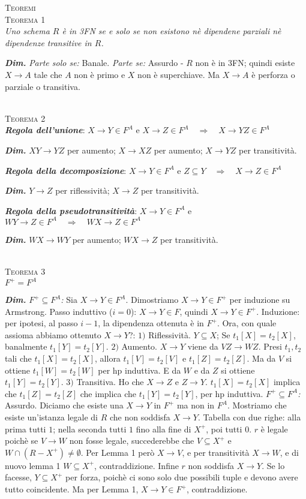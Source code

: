 \documentclass[a4paper,10pt]{article} %
\newcommand{\dimo}[1]{%
    \par \hfill\begin{minipage}{0.99\linewidth}{ \tiny {\textbf{\em{Dim.}}} {#1} }\end{minipage}}
\newcommand{\mtheorem}[1]{%
    {\hspace*{-10pt} \textsc {#1}}}
\newcommand{\msection}[1]{%
    {\normalsize \textsc {#1}\\[1ex]}}
\begin{document}
\msection{Teoremi}
    \mtheorem {Teorema 1}\\
        \emph{Uno schema $R$ è in 3FN se e solo se non esistono nè dipendene parziali nè dipendenze transitive in $R$.}
        \dimo{\emph{Parte solo se:} Banale.
              \emph{Parte se:} Assurdo - $R$ non è in 3FN; quindi esiste $X \rightarrow A$ tale che $A$ non è primo e $X$ non è superchiave. Ma $X \rightarrow A$ è perforza o parziale o transitiva.}
    \\[1ex]
    \mtheorem {Teorema 2}\\
        \emph{\textbf{Regola dell'unione}}: $X \rightarrow Y \in F^A$ e $X \rightarrow Z \in F^A \quad \Rightarrow \quad X \rightarrow YZ \in F^A$
        \dimo{$XY \rightarrow YZ$ per aumento; $X \rightarrow XZ$ per aumento; $X \rightarrow YZ$ per transitività.}
        \emph{\textbf{Regola della decomposizione}}: $X \rightarrow Y \in F^A$ e $Z \subseteq Y \quad \Rightarrow \quad X \rightarrow Z \in F^A$
        \dimo{$Y \rightarrow Z$ per riflessività; $X \rightarrow Z$ per transitività.}
        \emph{\textbf{Regola della pseudotransitività}}: $X \rightarrow Y \in F^A$ e $WY \rightarrow Z \in F^A \quad \Rightarrow \quad WX \rightarrow Z \in F^A$
        \dimo{$WX \rightarrow WY$ per aumento; $WX \rightarrow Z$ per transitività.}
    \\[1ex]
    \mtheorem {Teorema 3}\\
        \textbf{$F^+ = F^A$}
        \dimo{
            \emph{$F^+ \subseteq F^A$:} Sia $X \rightarrow Y \in F^A$. Dimostriamo $X \rightarrow Y \in F^+$ per induzione su Armstrong. Passo induttivo ($i = 0$): $X \rightarrow Y \in F$, quindi 
            $X \rightarrow Y \in F^+$. Induzione: per ipotesi, al passo $i - 1$, la dipendenza ottenuta è in $F^+$. Ora, con quale assioma abbiamo ottenuto $X \rightarrow Y$?:
            $1)$ Riflessività. $Y \subseteq X$; Se $t_1[X] = t_2[X]$, banalmente $t_1[Y] = t_2[Y]$. 
            $2)$ Aumento. $X \rightarrow Y$ viene da $VZ \rightarrow WZ$. Presi $t_1, t_2$ tali che $t_1[X] = t_2[X]$, allora $t_1[V] = t_2[V]$ e $t_1[Z] = t_2[Z]$. Ma da $V$ si ottiene $t_1[W] = t_2[W]$ per hp 
                 induttiva. E da $W$ e da $Z$ si ottiene $t_1[Y] = t_2[Y]$.
            $3)$ Transitiva. Ho che $X \rightarrow Z$ e $Z \rightarrow Y$. $t_1[X] = t_2[X]$ implica che $t_1[Z] = t_2[Z]$ che implica che $t_1[Y] = t_2[Y]$, per hp induttiva.
            \emph{$F^+ \subseteq F^A$:} Assurdo. Diciamo che esiste una $X \rightarrow Y$ in $F^+$ ma non in $F^A$. Mostriamo che esiste un'istanza legale di $R$ che non soddisfa $X \rightarrow Y$.
            Tabella con due righe: alla prima tutti $1$; nella seconda tutti $1$ fino alla fine di $X^+$, poi tutti $0$. $r$ è legale poichè se $V \rightarrow W$ non fosse legale, succederebbe che $V \subseteq X^+$
            e $W \cap (R - X^+) \neq \emptyset$. Per Lemma 1 però $X \rightarrow V$, e per transitività $X \rightarrow W$, e di nuovo lemma 1 $W \subseteq X^+$, contraddizione. Infine $r$ non soddisfa
            $X \rightarrow Y$. Se lo facesse, $Y \subseteq X^+$ per forza, poichè ci sono solo due possibili tuple e devono avere tutto coincidente. Ma per Lemma 1, $X \rightarrow Y \in F^+$, contraddizione.
        }
\end{document}
